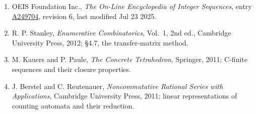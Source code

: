 \documentclass[11pt]{article}
\theoremstyle{definition}
\begin{document}
\begin{enumerate}

\item OEIS Foundation Inc., \emph{The On-Line Encyclopedia of Integer Sequences}, entry \href{https://oeis.org/A249704}{A249704}, revision 6, last modified Jul 23 2025.

\item R. P. Stanley, \emph{Enumerative Combinatorics}, Vol.~1, 2nd ed., Cambridge University Press, 2012; \S4.7, the transfer-matrix method.

\item M. Kauers and P. Paule, \emph{The Concrete Tetrahedron}, Springer, 2011; C-finite sequences and their closure properties.

\item J. Berstel and C. Reutenauer, \emph{Noncommutative Rational Series with Applications}, Cambridge University Press, 2011; linear representations of counting automata and their reduction.

\end{enumerate}
\end{document}
